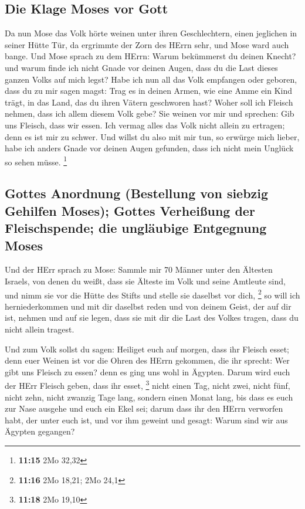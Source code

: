 \hypertarget{die-klage-moses-vor-gott}{%
\subsection{Die Klage Moses vor Gott}\label{die-klage-moses-vor-gott}}

 Da nun Mose das Volk hörte weinen unter ihren
Geschlechtern, einen jeglichen in seiner Hütte Tür, da ergrimmte der
Zorn des HErrn sehr, und Mose ward auch bange.  Und Mose
sprach zu dem HErrn: Warum bekümmerst du deinen Knecht? und warum finde
ich nicht Gnade vor deinen Augen, dass du die Last dieses ganzen Volks
auf mich legst?  Habe ich nun all das Volk empfangen oder
geboren, dass du zu mir sagen magst: Trag es in deinen Armen, wie eine
Amme ein Kind trägt, in das Land, das du ihren Vätern geschworen hast?
 Woher soll ich Fleisch nehmen, dass ich allem diesem
Volk gebe? Sie weinen vor mir und sprechen: Gib uns Fleisch, dass wir
essen.  Ich vermag alles das Volk nicht allein zu
ertragen; denn es ist mir zu schwer.  Und willst du also
mit mir tun, so erwürge mich lieber, habe ich anders Gnade vor deinen
Augen gefunden, dass ich nicht mein Unglück so sehen müsse. \footnote{\textbf{11:15}
  2Mo 32,32}

\hypertarget{gottes-anordnung-bestellung-von-siebzig-gehilfen-moses-gottes-verheiuxdfung-der-fleischspende-die-ungluxe4ubige-entgegnung-moses}{%
\subsection{Gottes Anordnung (Bestellung von siebzig Gehilfen Moses);
Gottes Verheißung der Fleischspende; die ungläubige Entgegnung
Moses}\label{gottes-anordnung-bestellung-von-siebzig-gehilfen-moses-gottes-verheiuxdfung-der-fleischspende-die-ungluxe4ubige-entgegnung-moses}}

 Und der HErr sprach zu Mose: Sammle mir 70 Männer unter
den Ältesten Israels, von denen du weißt, dass sie Älteste im Volk und
seine Amtleute sind, und nimm sie vor die Hütte des Stifts und stelle
sie daselbst vor dich, \footnote{\textbf{11:16} 2Mo 18,21; 2Mo 24,1}
 so will ich herniederkommen und mit dir daselbst reden
und von deinem Geist, der auf dir ist, nehmen und auf sie legen, dass
sie mit dir die Last des Volkes tragen, dass du nicht allein tragest.

 Und zum Volk sollst du sagen: Heiliget euch auf morgen,
dass ihr Fleisch esset; denn euer Weinen ist vor die Ohren des HErrn
gekommen, die ihr sprecht: Wer gibt uns Fleisch zu essen? denn es ging
uns wohl in Ägypten. Darum wird euch der HErr Fleisch geben, dass ihr
esset, \footnote{\textbf{11:18} 2Mo 19,10}  nicht einen
Tag, nicht zwei, nicht fünf, nicht zehn, nicht zwanzig Tage lang,
 sondern einen Monat lang, bis dass es euch zur Nase
ausgehe und euch ein Ekel sei; darum dass ihr den HErrn verworfen habt,
der unter euch ist, und vor ihm geweint und gesagt: Warum sind wir aus
Ägypten gegangen?

